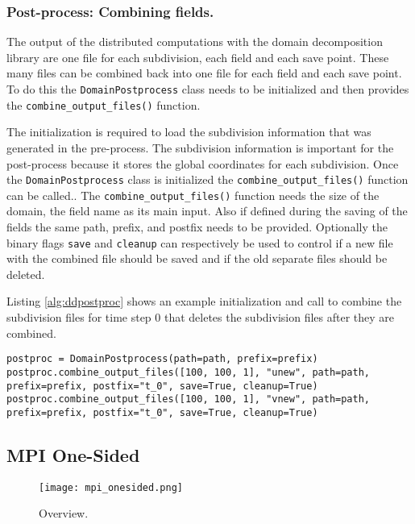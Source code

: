 \subsubsection{Post-process: Combining fields.}
The output of the distributed computations with the domain decomposition library are one file for each subdivision, each field and each save point.
These many files can be combined back into one file for each field and each save point.
To do this the \texttt{DomainPostprocess} class needs to be initialized and then provides the \texttt{combine\_output\_files()} function.

The initialization is required to load the subdivision information that was generated in the pre-process.
The subdivision information is important for the post-process because it stores the global coordinates for each subdivision.
Once the \texttt{DomainPostprocess} class is initialized the \texttt{combine\_output\_files()} function can be called..
The \texttt{combine\_output\_files()} function needs the size of the domain, the field name as its main input.
Also if defined during the saving of the fields the same path, prefix, and postfix needs to be provided.
Optionally the binary flags \texttt{save} and \texttt{cleanup} can respectively be used to control if a new file with the combined file should be saved and if the old separate files should be deleted.

Listing \ref{alg:ddpostproc} shows an example initialization and call to combine the subdivision files for time step 0 that deletes the subdivision files after they are combined.

\begin{lstlisting}[caption={Example post-processing.},captionpos=b, label={alg:ddpostproc}, float, floatplacement=H]
postproc = DomainPostprocess(path=path, prefix=prefix)
postproc.combine_output_files([100, 100, 1], "unew", path=path, prefix=prefix, postfix="t_0", save=True, cleanup=True)
postproc.combine_output_files([100, 100, 1], "vnew", path=path, prefix=prefix, postfix="t_0", save=True, cleanup=True)
\end{lstlisting}

\newpage
\subsection{MPI One-Sided}

\begin{figure}
\centering
\texttt{[image: mpi\_onesided.png]}
\caption{Overview.}
\label{fig:mpi_onesided_communication_flow}
\end{figure}



